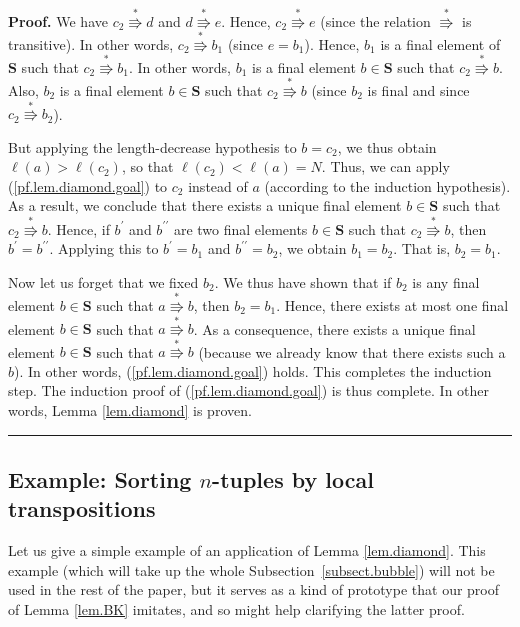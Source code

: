 \documentclass[numbers=enddot,12pt,final,onecolumn,notitlepage]{scrartcl}%
\theoremstyle{definition}
\newenvironment{proof}[1][Proof]{\noindent\textbf{#1.} }{\ \rule{0.5em}{0.5em}}
\begin{document}
\begin{proof}
We have $c_{2}\overset{\ast}{\Rrightarrow}d$ and $d\overset{\ast
}{\Rrightarrow}e$. Hence, $c_{2}\overset{\ast}{\Rrightarrow}e$ (since the
relation $\overset{\ast}{\Rrightarrow}$ is transitive). In other words,
$c_{2}\overset{\ast}{\Rrightarrow}b_{1}$ (since $e=b_{1}$). Hence, $b_{1}$ is
a final element of $\mathbf{S}$ such that $c_{2}\overset{\ast}{\Rrightarrow
}b_{1}$. In other words, $b_{1}$ is a final element $b\in\mathbf{S}$ such that
$c_{2}\overset{\ast}{\Rrightarrow}b$. Also, $b_{2}$ is a final element
$b\in\mathbf{S}$ such that $c_{2}\overset{\ast}{\Rrightarrow}b$ (since $b_{2}$
is final and since $c_{2}\overset{\ast}{\Rrightarrow}b_{2}$).

But applying the length-decrease hypothesis to $b=c_{2}$, we thus obtain
$\ell\left(  a\right)  >\ell\left(  c_{2}\right)  $, so that $\ell\left(
c_{2}\right)  <\ell\left(  a\right)  =N$. Thus, we can apply
(\ref{pf.lem.diamond.goal}) to $c_{2}$ instead of $a$ (according to the
induction hypothesis). As a result, we conclude that there exists a unique
final element $b\in\mathbf{S}$ such that $c_{2}\overset{\ast}{\Rrightarrow}b$.
Hence, if $b^{\prime}$ and $b^{\prime\prime}$ are two final elements
$b\in\mathbf{S}$ such that $c_{2}\overset{\ast}{\Rrightarrow}b$, then
$b^{\prime}=b^{\prime\prime}$. Applying this to $b^{\prime}=b_{1}$ and
$b^{\prime\prime}=b_{2}$, we obtain $b_{1}=b_{2}$. That is, $b_{2}=b_{1}$.

Now let us forget that we fixed $b_{2}$. We thus have shown that if $b_{2}$ is
any final element $b\in\mathbf{S}$ such that $a\overset{\ast}{\Rrightarrow}b$,
then $b_{2}=b_{1}$. Hence, there exists at most one final element
$b\in\mathbf{S}$ such that $a\overset{\ast}{\Rrightarrow}b$. As a consequence,
there exists a unique final element $b\in\mathbf{S}$ such that $a\overset{\ast
}{\Rrightarrow}b$ (because we already know that there exists such a $b$). In
other words, (\ref{pf.lem.diamond.goal}) holds. This completes the induction
step. The induction proof of (\ref{pf.lem.diamond.goal}) is thus complete. In
other words, Lemma \ref{lem.diamond} is proven.
\end{proof}

\subsection{\label{subsect.bubble}Example: Sorting $n$-tuples by local
transpositions}

Let us give a simple example of an application of Lemma \ref{lem.diamond}.
This example (which will take up the whole Subsection~\ref{subsect.bubble})
will not be used in the rest of the paper, but it serves as a kind of
prototype that our proof of Lemma \ref{lem.BK} imitates, and so might help
clarifying the latter proof.
\end{document}
